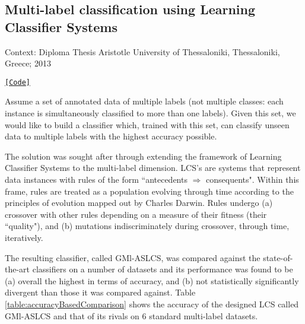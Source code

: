\subsection{Multi-label classification using Learning Classifier Systems}

\noindent Context: Diploma Thesis
\noindent Aristotle University of Thessaloniki, Thessaloniki, Greece; 2013

\noindent \href{https://github.com/li9i/lcss}{\texttt{[Code]}}

\begin{problem}
Assume a set of annotated data of multiple labels (not
multiple classes: each instance is simultaneously classified to more than one
labels). Given this set, we would like to build a classifier which, trained with
this set, can classify unseen data to multiple labels with the highest accuracy
possible.
\end{problem}

The solution was sought after through extending the framework of Learning
Classifier Systems to the multi-label dimension. LCS's are systems that
represent data instances with rules of the form ``antecedents $\Rightarrow$
consequents". Within this frame, rules are treated as a population evolving
through time according to the principles of evolution mapped out by Charles
Darwin. Rules undergo (a) crossover with other rules depending on a measure of
their fitness (their ``quality"), and (b) mutations indiscriminately during
crossover, through time, iteratively.

The resulting classifier, called GMl-ASLCS, was compared against the
state-of-the-art classifiers on a number of datasets and its performance was
found to be (a) overall the highest in terms of accuracy, and (b) not
statistically significantly divergent than those it was compared against. Table
\ref{table:accuracyBasedComparison} shows the accuracy of the designed LCS
called GMl-ASLCS and that of its rivals on 6 standard multi-label datasets.

